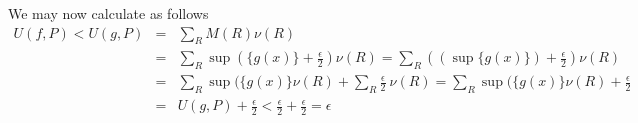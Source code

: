 \documentclass[11pt,reqno]{article}
\begin{document}
We may now calculate as follows
\begin{eqnarray*}
U(f,P) < U(g,P) &=& \sum_R M(R) \nu(R) \\ 
&=& \sum_R \sup ( \{ g(x) \} + \frac{\epsilon}{2} ) \nu(R) = \sum_R ((\sup \{ g(x)\})  + \frac{\epsilon}{2} ) \nu(R) \\ 
&=& \sum_R \sup ( \{ g(x) \} \nu(R) + \sum_R \frac{\epsilon}{2} \:\nu(R) =  \sum_R \sup ( \{ g(x) \} \nu(R) + \frac{\epsilon}{2} \\ 
&=& U(g,P) + \frac{\epsilon}{2} < \frac{\epsilon}{2} + \frac{\epsilon}{2} = \epsilon \\
\end{eqnarray*}
\end{document}
